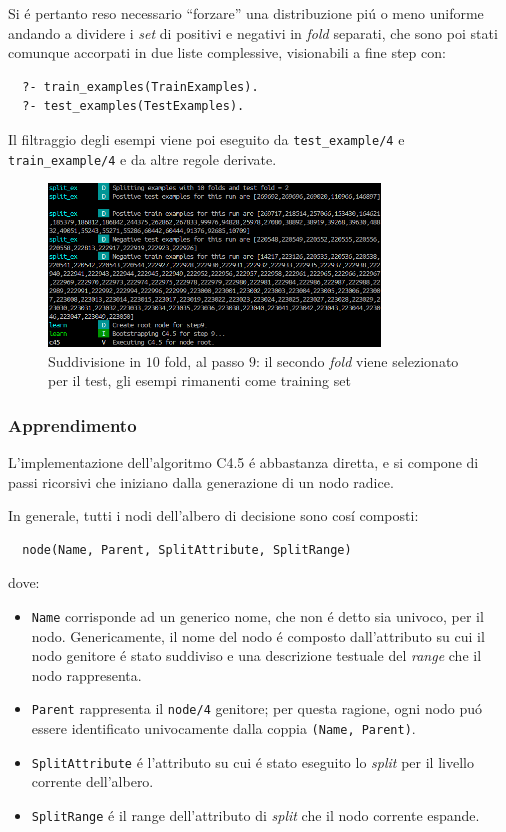 \documentclass[preprint]{acm_proc_article-sp}
\begin{document}
Si \'e pertanto reso necessario ``forzare'' una distribuzione pi\'u o meno uniforme andando a dividere i \textit{set} di positivi e negativi in \textit{fold} separati, che sono poi stati comunque accorpati in due liste complessive, visionabili a fine step con:
\begin{verbatim}
  ?- train_examples(TrainExamples).
  ?- test_examples(TestExamples).
\end{verbatim}

Il filtraggio degli esempi viene poi eseguito da \verb|test_example/4| e \verb|train_example/4| e da altre regole derivate.

\begin{figure}[!htb]
\centering
\includegraphics[width=250pt]{figures/prolog-k-fold.png}
\caption{Suddivisione in $10$ fold, al passo $9$: il secondo \textit{fold} viene selezionato per il test, gli esempi rimanenti come training set}
\label{fig:prolog-k-fold}
\end{figure}

\subsubsection{Apprendimento}
L'implementazione dell'algoritmo C4.5 \'e abbastanza diretta, e si compone di passi ricorsivi che iniziano dalla generazione di un nodo radice.

In generale, tutti i nodi dell'albero di decisione sono cos\'i composti:
\begin{verbatim}
  node(Name, Parent, SplitAttribute, SplitRange)
\end{verbatim}
dove:
\begin{itemize}
\item \verb|Name| corrisponde ad un generico nome, che non \'e detto sia univoco, per il nodo. Genericamente, il nome del nodo \'e composto dall'attributo su cui il nodo genitore \'e stato suddiviso e una descrizione testuale del \textit{range} che il nodo rappresenta.
\item \verb|Parent| rappresenta il \verb|node/4| genitore; per questa ragione, ogni nodo pu\'o essere identificato univocamente dalla coppia \verb|(Name, Parent)|.
\item \verb|SplitAttribute| \'e l'attributo su cui \'e stato eseguito lo \textit{split} per il livello corrente dell'albero.
\item \verb|SplitRange| \'e il range dell'attributo di \textit{split} che il nodo corrente espande.
\end{itemize}
\end{document}
